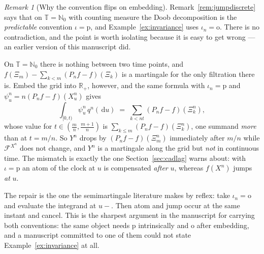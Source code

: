 \documentclass[11pt,a4paper]{article}
\theoremstyle{plain}
\theoremstyle{definition}
\theoremstyle{remark}
\newtheorem{remark}[theorem]{Remark}
\newcommand{\R}{\mathbb{R}}
\newcommand{\N}{\mathbb{N}}
\newcommand{\Rp}{\R_+}
\newcommand{\T}{\mathbb{T}}                     %
\newcommand{\Filt}{\mathcal{F}}
\newcommand{\dif}{\,\mathrm{d}}
\begin{document}
\begin{remark}[Why the convention flips on embedding]
  \label{rem:embedflip}
  Remark~\ref{rem:jumpdiscrete} says that on $\T = \N_0$ with counting measure the
  Doob decomposition is the \emph{predictable} convention $\iota = \mathrm{p}$,
  and Example~\ref{ex:invariance} uses $\iota_n = \mathrm{o}$.  There is no
  contradiction, and the point is worth isolating because it is easy to get wrong
  --- an earlier version of this manuscript did.

  On $\T = \N_0$ there is nothing between two time points, and
  $f(\Xi_m) - \sum_{k<m}(P_nf-f)(\Xi_k)$ is a martingale for the only filtration
  there is.  Embed the grid into $\Rp$, however, and the same formula with
  $\iota_n = \mathrm{p}$ and $\psi^n_u = n(P_nf-f)(X^n_u)$ gives
  \[
    \int_{[0,t)} \psi^n_u \, q^n(\dif u) \;=\; \sum_{k < nt} (P_nf-f)(\Xi^n_k) ,
  \]
  whose value for $t \in (\tfrac{m}{n},\tfrac{m+1}{n})$ is
  $\sum_{k \leq m}(P_nf-f)(\Xi^n_k)$, one summand \emph{more} than at $t = m/n$.
  So $Y^n$ drops by $(P_nf-f)(\Xi^n_m)$ immediately after $m/n$ while
  $\Filt^{X^n}$ does not change, and $Y^n$ is a martingale along the grid but
  \emph{not} in continuous time.  The mismatch is exactly the one
  Section~\ref{sec:cadlag} warns about: with $\iota = \mathrm{p}$ an atom of the
  clock at $u$ is compensated \emph{after} $u$, whereas $f(X^n)$ jumps \emph{at}
  $u$.

  The repair is the one the semimartingale literature makes by reflex: take
  $\iota_n = \mathrm{o}$ and evaluate the integrand at $u-$.  Then atom and jump
  occur at the same instant and cancel.  This is the sharpest argument in the
  manuscript for carrying both conventions: the same object needs $\mathrm{p}$
  intrinsically and $\mathrm{o}$ after embedding, and a manuscript committed to
  one of them could not state Example~\ref{ex:invariance} at all.
\end{remark}
\end{document}

